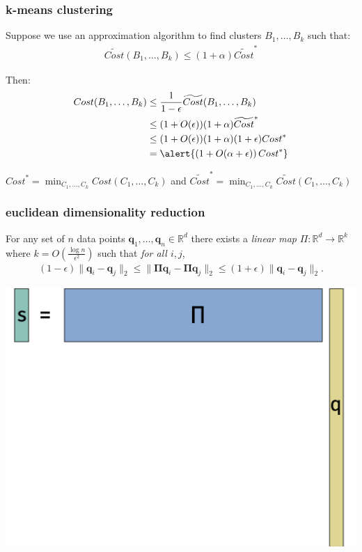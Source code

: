 \documentclass[compress]{beamer}
\newcommand{\bs}[1]{\boldsymbol{#1}}
\newcommand{\bv}[1]{\mathbf{#1}}
\newcommand{\R}{\mathbb{R}}
\begin{document}
\begin{frame}[t]
	\frametitle{k-means clustering}
	Suppose we use an approximation algorithm to find clusters $B_1, \ldots, B_k$ such that:
	\begin{align*}
		\widetilde{Cost}(B_1,\ldots, B_k) \leq (1+\alpha)\widetilde{Cost}^*
	\end{align*}
	
	Then: 
	\begin{align*}
		{Cost}(B_1,\ldots, B_k) &\leq \frac{1}{1-\epsilon}\widetilde{Cost}(B_1,\ldots, B_k) \\
		&\leq(1+O(\epsilon)) (1+\alpha)\widetilde{Cost}^*\\
		&\leq (1+O(\epsilon))(1+\alpha)(1+\epsilon){Cost}^*\\
		&= \alert{\left(1 + O(\alpha + \epsilon)\right){Cost}^*}
	\end{align*}
	
	\vspace{1em}
	\begin{block}{\vspace*{-3ex}}
		\small ${Cost}^* = \min_{C_1, \ldots, C_k} Cost(C_1, \ldots, C_k)$ and $\widetilde{Cost}^* = \min_{C_1, \ldots, C_k} \widetilde{Cost}(C_1, \ldots, C_k) $
	\end{block}
\end{frame}

\begin{frame}
	\frametitle{euclidean dimensionality reduction}
	\begin{lemma}
		For any set of $n$ data points $\bv{q}_1,\ldots, \bv{q}_n \in \R^d$ there exists a \emph{linear map} $\Pi: \R^d \rightarrow \R^k$ where $k = O\left(\frac{\log n}{\epsilon^2}\right)$ such that \emph{for all $i,j$},
		\begin{align*}
			(1-\epsilon)\|\bv{q}_i - \bv{q}_j\|_2 \leq \|\bs{\Pi}\bv{q}_i - \bs{\Pi}\bv{q}_j\|_2 \leq (1+\epsilon)\|\bv{q}_i - \bv{q}_j\|_2.
		\end{align*}
	\end{lemma}
	\begin{center}
		\includegraphics[height=.45\textheight]{jl_sketch.png}
	\end{center}
\end{frame}
\end{document}

